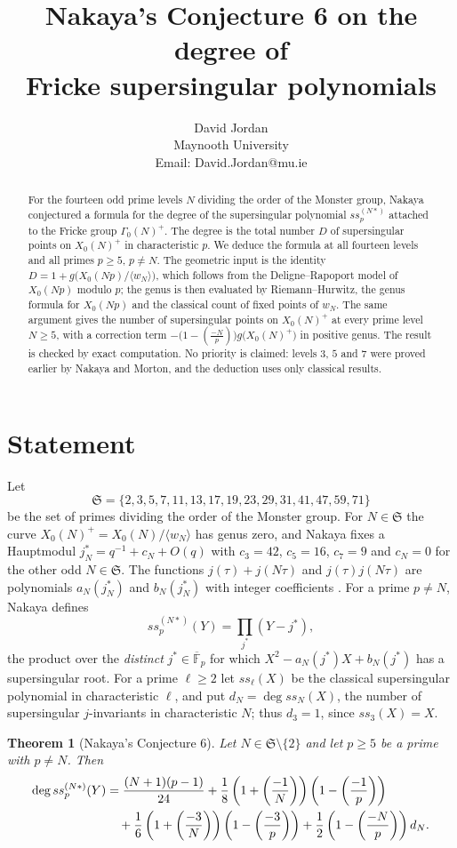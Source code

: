 \documentclass[11pt,a4paper]{article}
\title{Nakaya's Conjecture 6 on the degree of\\Fricke supersingular polynomials}
\author{David Jordan\\\small Maynooth University\\\small Email: David.Jordan@mu.ie}
\date{}
\newtheorem{theorem}{Theorem}[section]
\theoremstyle{remark}\newtheorem{remark}[theorem]{Remark}
\numberwithin{equation}{section}
\newcommand{\kk}{\overline{\mathbb F}_p}
\newcommand{\leg}[2]{\left(\frac{#1}{#2}\right)}
\begin{document}
\maketitle
\begin{abstract}
For the fourteen odd prime levels $N$ dividing the order of the Monster group, Nakaya conjectured a formula for the degree of the supersingular polynomial $ss_p^{(N*)}$ attached to the Fricke group $\Gamma_0(N)^+$. The degree is the total number $D$ of supersingular points on $X_0(N)^+$ in characteristic $p$. We deduce the formula at all fourteen levels and all primes $p\geq5$, $p\neq N$. The geometric input is the identity $D=1+g\bigl(X_0(Np)/\langle w_N\rangle\bigr)$, which follows from the Deligne--Rapoport model of $X_0(Np)$ modulo $p$; the genus is then evaluated by Riemann--Hurwitz, the genus formula for $X_0(Np)$ and the classical count of fixed points of $w_N$. The same argument gives the number of supersingular points on $X_0(N)^+$ at every prime level $N\geq5$, with a correction term $-\bigl(1-\leg{-N}{p}\bigr)g\bigl(X_0(N)^+\bigr)$ in positive genus. The result is checked by exact computation. No priority is claimed: levels $3$, $5$ and $7$ were proved earlier by Nakaya and Morton, and the deduction uses only classical results.
\end{abstract}

\section{Statement}
Let
\[
\mathfrak S=\{2,3,5,7,11,13,17,19,23,29,31,41,47,59,71\}
\]
be the set of primes dividing the order of the Monster group. For $N\in\mathfrak S$ the curve $X_0(N)^+=X_0(N)/\langle w_N\rangle$ has genus zero, and Nakaya \cite[Section 4.1]{Nakaya} fixes a Hauptmodul $j_N^*=q^{-1}+c_N+O(q)$ with $c_3=42$, $c_5=16$, $c_7=9$ and $c_N=0$ for the other odd $N\in\mathfrak S$. The functions $j(\tau)+j(N\tau)$ and $j(\tau)j(N\tau)$ are polynomials $a_N(j_N^*)$ and $b_N(j_N^*)$ with integer coefficients \cite[Proposition 4]{Nakaya}. For a prime $p\neq N$, Nakaya defines
\[
ss_p^{(N*)}(Y)=\prod_{j^*}(Y-j^*),
\]
the product over the \emph{distinct} $j^*\in\kk$ for which $X^2-a_N(j^*)X+b_N(j^*)$ has a supersingular root. For a prime $\ell\geq2$ let $ss_\ell(X)$ be the classical supersingular polynomial in characteristic $\ell$, and put $d_N=\deg ss_N(X)$, the number of supersingular $j$-invariants in characteristic $N$; thus $d_3=1$, since $ss_3(X)=X$.

\begin{theorem}[Nakaya's Conjecture 6]\label{thm:main}
Let $N\in\mathfrak S\setminus\{2\}$ and let $p\geq5$ be a prime with $p\neq N$. Then
\begin{align}
\deg ss_p^{(N*)}(Y)
&=\frac{(N+1)(p-1)}{24}
+\frac18\left(1+\leg{-1}{N}\right)\left(1-\leg{-1}{p}\right)\notag\\
&\quad+\frac16\left(1+\leg{-3}{N}\right)\left(1-\leg{-3}{p}\right)
+\frac12\left(1-\leg{-N}{p}\right)d_N.\label{eq:C6}
\end{align}
\end{theorem}
\end{document}

